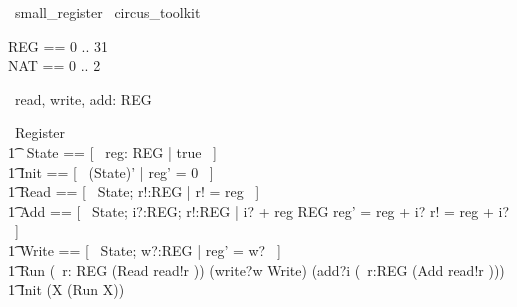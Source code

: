 \documentclass{article}
\begin{document}
\begin{zsection}
	\SECTION\ small\_register \parents\ circus\_toolkit
\end{zsection}

\begin{zed}
	REG == 0 .. 31 \\
	NAT == 0 .. 2 
\end{zed}

\begin{circus}
	\circchannel\ read, write, add: REG\\
\end{circus}

\begin{circus}
	\circprocess\ Register \circdef \circbegin \\
    	\t1 \circstate\ State == [~ reg: REG | true ~] \\
    	\t1	Init == [~ (State)' | reg' = 0 ~] \\
		\t1 Read == [~ \Xi State; r!:REG | r! = reg ~] \\
		\t1 Add == [~ \Delta State; i?:REG; r!:REG | i? + reg \in REG \land reg' = reg + i? \land r! = reg + i? ~] \\
		\t1 Write == [~ \Delta State; w?:REG | reg' = w? ~] \\
		\t1 Run \circdef (\circvar\ r: REG \circspot (Read \circseq read!r \then \Skip)) \extchoice (write?w \then Write) 
			\extchoice (add?i \then (\circvar\ r:REG \circspot (Add \circseq read!r \then \Skip)))
			\\
		\t1 \circspot Init \circseq (\circmu X \circspot (Run \circseq X)) \\
	\circend
\end{circus}
\end{document}
